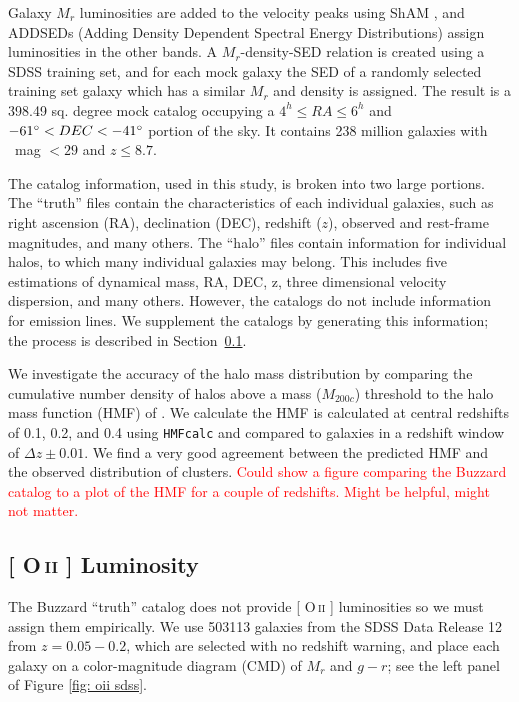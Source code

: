 \documentclass[fleqn,usenatbib]{mnras}
\makeatletter
\newcommand{\editorial}[1]{\textcolor{red}{#1}}
\DeclareRobustCommand{\ion}[2]{%
\relax\ifmmode
\ifx\testbx\f@series
{\mathbf{#1\,\mathsc{#2}}}\else
{\mathrm{#1\,\mathsc{#2}}}\fi
\else\textup{#1\,{\mdseries\textsc{#2}}}%
\fi}
\makeatother
\begin{document}
Galaxy $M_r$ luminosities are added to the velocity peaks using ShAM \citep{Reddick2013}, and ADDSEDs (Adding Density Dependent Spectral Energy Distributions) assign luminosities in the other bands. A $M_r$-density-SED relation is created using a SDSS training set, and for each mock galaxy the SED of a randomly selected training set galaxy which has a similar $M_r$ and density is assigned. The result is a 398.49 sq. degree mock catalog occupying a $4^h \leq RA \leq 6^h$ and $-61\hbox{$^\circ$} < DEC < -41\hbox{$^\circ$}$ portion of the sky. It contains 238 million galaxies with \sdssr\ mag $< 29$ and $z \leq 8.7$.

The catalog information, used in this study, is broken into two large portions. The ``truth'' files contain the characteristics of each individual galaxies, such as right ascension (RA), declination (DEC), redshift ($z$), observed and rest-frame magnitudes, and many others. The ``halo'' files contain information for individual halos, to which many individual galaxies may belong. This includes five estimations of dynamical mass, RA, DEC, z, three dimensional velocity dispersion, and many others. However, the catalogs do not include information for emission lines. We supplement the catalogs by generating this information; the process is described in Section~\ref{sec: oii luminosity}.


We investigate the accuracy of the halo mass distribution by comparing the cumulative number density of halos above a mass ($M_{200c}$) threshold to the halo mass function (HMF) of \cite{Tinker2008}. We calculate the HMF is calculated at central redshifts of 0.1, 0.2, and 0.4 using {\tt HMFcalc} \citep{Murray2013} and compared to galaxies in a redshift window of $\Delta z\pm0.01$. We find a very good agreement between the predicted HMF and the observed distribution of clusters. \editorial{Could show a figure comparing the Buzzard catalog to a plot of the HMF for a couple of redshifts. Might be helpful, might not matter.}

\subsection{ {\rm[\ion{O}{ii}]} Luminosity}\label{sec: oii luminosity}
The Buzzard ``truth'' catalog does not provide [\ion{O}{ii}] luminosities so we must assign them empirically. We use 503113 galaxies from the SDSS Data Release 12 \citep{Alam2015} from $z = 0.05 - 0.2$, which are selected with no redshift warning, and place each galaxy on a color-magnitude diagram (CMD) of $M_r$ and $g-r$; see the left panel of Figure \ref{fig: oii sdss}.
\end{document}
